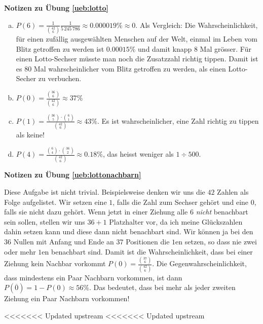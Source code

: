 \documentclass[%
<<<<<<< Updated upstream
<<<<<<< Updated upstream
11pt,%
twoside,%
titlepage,%
german,%
=======
=======
>>>>>>> Stashed changes
11pt,%
twoside,%
titlepage,%
swissgerman,%
<<<<<<< Updated upstream
>>>>>>> Stashed changes
=======
>>>>>>> Stashed changes
headsepline%
]{scrartcl}
\newcommand{\faReturnGray}{\textcolor{gray}{\faMailReply}} %
\theoremstyle{definition}
\theoremstyle{plain}
\newcommand{\concatueb}[1]{ueb:#1}%
\newcommand{\concatlsg}[1]{lsg:#1}%
\newenvironment{lsg}[1]{%
    \par\noindent\textbf{Notizen zu Übung \ref{\concatueb{#1}}}\label{\concatlsg{#1}}
    \hfill\hyperref[\concatueb{#1}]{\faReturnGray}\par %
}{%
    \par%
}
\newcounter{satzz}[section]\setcounter{satzz}{0}
\newcommand{\concatueb}[1]{ueb:#1}%
\newcommand{\concatlsg}[1]{lsg:#1}%
\newenvironment{lsg}[1]{%
    \par\noindent\textbf{Notizen zu Übung \ref{\concatueb{#1}}.}%
    \label{\concatlsg{#1}}
}{%
    \par%
}
\begin{document}
\begin{lsg}{lotto}
\begin{enumerate}[a)]
\item $P(6)=\frac{1}{\binom{42}{6}}\frac{1}{5\,245\,786}\approx0.000019\%\approx0$. Als Vergleich: Die Wahrscheinlichkeit, f\"ur einen zuf\"allig ausgew\"ahlten Menschen auf der Welt, einmal im Leben vom Blitz getroffen zu werden ist $0.00015\%$ und damit knapp $8$ Mal gr\"osser. F\"ur einen Lotto-Sechser m\"usste man noch die Zusatzzahl richtig tippen. Damit ist es $80$ Mal wahrscheinlicher vom Blitz getroffen zu werden, als einen Lotto-Secher zu verbuchen.
\item $P(0)=\frac{\binom{36}{6}}{\binom{42}{6}}\approx37\%$
\item $P(1)=\frac{\binom{36}{5}\cdot\binom{6}{1}}{\binom{42}{6}}\approx43\%$. Es ist wahrscheinlicher, eine Zahl richtig zu tippen als keine!
\item $P(4)=\frac{\binom{6}{4}\cdot\binom{36}{2}}{\binom{42}{6}}\approx0.18\%$, das heisst weniger als $1\div500$.
\end{enumerate}
\end{lsg}

\begin{lsg}{lottonachbarn}
Diese Aufgabe ist nicht trivial. Beispielsweise denken wir uns die $42$ Zahlen als Folge aufgelistet. Wir setzen eine $1$, falls die Zahl zum Sechser geh\"ort und eine $0$, falls sie nicht dazu geh\"ort. Wenn jetzt in einer Ziehung alle $6$ \emph{nicht} benachbart sein sollen, stellen wir uns $36+1$ Platzhalter vor, da ich meine Gl\"uckszahlen dahin setzen kann und diese dann nicht benachbart sind. Wir k\"onnen ja bei den $36$ Nullen mit Anfang und Ende an $37$ Positionen die $1$en setzen, so dass nie zwei oder mehr $1$en benachbart sind. Damit ist die Wahrscheinlichkeit, dass bei einer Ziehung kein Nachbar vorkommt $P(0)=\frac{\binom{37}{6}}{\binom{42}{6}}$. Die Gegenwahrscheinlichkeit, dass mindestens ein Paar Nachbarn vorkommen, ist dann $P(\overline{0})=1-P(0)\approx56\%$. Das bedeutet, dass bei mehr als jeder zweiten Ziehung ein Paar Nachbarn vorkommen!
\end{lsg}

<<<<<<< Updated upstream
<<<<<<< Updated upstream
\end{document}
